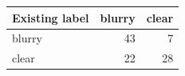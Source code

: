 \begin{tabular}{lrr}
\toprule
Existing label & blurry & clear \\
\midrule
blurry & 43 & 7 \\
clear & 22 & 28 \\
\bottomrule
\end{tabular}
